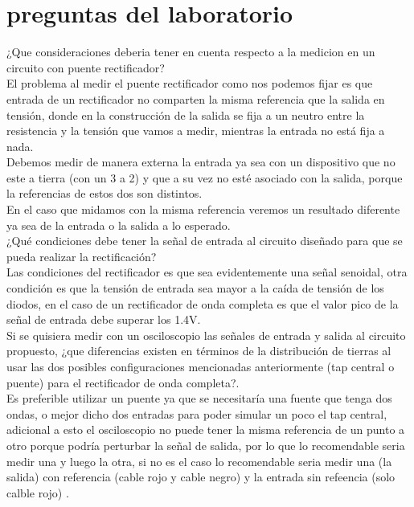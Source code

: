 \section{preguntas del laboratorio}
¿Que consideraciones deberia tener en cuenta respecto a la medicion en un circuito con puente rectificador?\\

El problema al medir el puente rectificador como nos podemos fijar es que  entrada de un rectificador no comparten  la misma referencia que la salida en tensión, donde en la construcción de la salida se fija a un neutro entre la resistencia y la tensión que vamos a medir, mientras la entrada no está fija a nada.\\

Debemos medir de manera externa la entrada ya sea con un dispositivo que no este a tierra (con un 3 a 2) y que a su vez no esté asociado con la salida, porque la referencias de estos dos son distintos.\\

En el caso que midamos con la misma referencia veremos un resultado diferente ya sea de la entrada o la salida a lo esperado.\\


¿Qué condiciones debe tener la señal de entrada al circuito diseñado para que se pueda realizar la rectificación?\\

Las condiciones del rectificador es que sea evidentemente una señal senoidal, otra condición es que la tensión de entrada sea mayor a la caída de tensión de los diodos, en el caso de un rectificador de onda completa es que el valor pico de la señal de entrada debe superar los 1.4V.\\

 Si se quisiera medir con un osciloscopio las señales de entrada y salida al circuito propuesto, ¿que diferencias existen en términos de la distribución de tierras al usar las dos posibles configuraciones mencionadas anteriormente (tap central o puente) para el rectificador de onda completa?.\\

Es preferible utilizar un puente ya que se necesitaría una fuente que tenga dos ondas, o mejor dicho dos entradas para poder simular un poco el tap central, adicional a esto el osciloscopio no puede tener la misma referencia de un punto a otro porque podría perturbar la señal de salida, por lo que lo recomendable seria medir una y luego la otra, si no es el caso lo recomendable seria medir una (la salida) con referencia (cable rojo y cable negro) y la entrada sin refeencia (solo calble rojo) .\\

